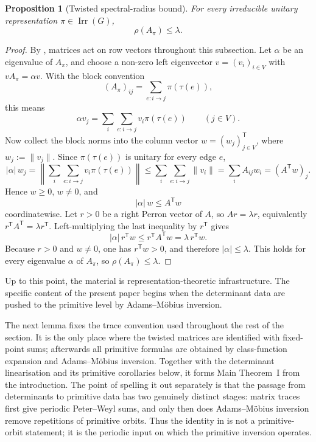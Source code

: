 \documentclass[11pt,a4paper]{amsart}
\theoremstyle{plain}
\newtheorem{proposition}[theorem]{Proposition}
\theoremstyle{definition}
\theoremstyle{remark}
\DeclareMathOperator{\Irr}{Irr}
\begin{document}
\begin{proposition}[Twisted spectral-radius bound]
  \label{prop:twisted-spectral-radius-bound}
  For every irreducible unitary representation
  \(\pi\in\Irr(G)\),
  \[
    \rho(A_\pi)\le \lambda.
  \]
\end{proposition}

\begin{proof}
  By , matrices act
  on row vectors throughout this subsection. Let \(\alpha\) be an
  eigenvalue of \(A_\pi\), and choose a non-zero left eigenvector
  \(v=(v_i)_{i\in V}\) with
  \(vA_\pi=\alpha v\). With the block convention
  \[
    (A_\pi)_{ij}=\sum_{e:i\to j}\pi(\tau(e)),
  \]
  this means
  \[
    \alpha v_j
    =
    \sum_i\sum_{e:i\to j}v_i\pi(\tau(e))
    \qquad (j\in V).
  \]
  Now collect the block norms into the column vector
  \(w=(w_j)_{j\in V}^{\mathsf T}\), where \(w_j:=\|v_j\|\). Since
  \(\pi(\tau(e))\) is unitary for every edge \(e\),
  \[
    |\alpha|\,w_j
    =
    \left\|\sum_i\sum_{e:i\to j}v_i\pi(\tau(e))\right\|
    \le \sum_i\sum_{e:i\to j}\|v_i\|
    =\sum_i A_{ij}w_i
    =(A^{\mathsf T}w)_j.
  \]
  Hence \(w\ge 0\), \(w\neq 0\), and
  \[
    |\alpha|\,w\le A^{\mathsf T}w
  \]
  coordinatewise. Let \(r>0\) be a right Perron vector of \(A\), so
  \(Ar=\lambda r\), equivalently
  \(r^{\mathsf T}A^{\mathsf T}=\lambda r^{\mathsf T}\). Left-multiplying
  the last inequality by \(r^{\mathsf T}\) gives
  \[
    |\alpha|\,r^{\mathsf T}w
    \le
    r^{\mathsf T}A^{\mathsf T}w
    =
    \lambda\,r^{\mathsf T}w.
  \]
  Because \(r>0\) and \(w\neq 0\), one has \(r^{\mathsf T}w>0\), and
  therefore \(|\alpha|\le \lambda\). This holds for every eigenvalue
  \(\alpha\) of \(A_\pi\), so \(\rho(A_\pi)\le \lambda\).
\end{proof}

\noindent
Up to this point, the material is representation-theoretic
infrastructure. The specific content of the present paper begins when
the determinant data are pushed to the primitive level by
Adams--M\"obius inversion.

The next lemma fixes the trace convention used throughout the rest of
the section. It is the only place where the twisted matrices are
identified with fixed-point sums; afterwards all primitive formulas are
obtained by class-function expansion and Adams--M\"obius inversion.
Together with the determinant linearisation and its primitive
corollaries below, it forms Main Theorem~I from the introduction.
The point of spelling it out separately is that the passage from
determinants to primitive data has two genuinely distinct stages:
matrix traces first give periodic Peter--Weyl sums, and only then does
Adams--M\"obius inversion remove repetitions of primitive orbits.
Thus the identity in  is not a
primitive-orbit statement; it is the periodic input on which the
primitive inversion operates.
\end{document}
